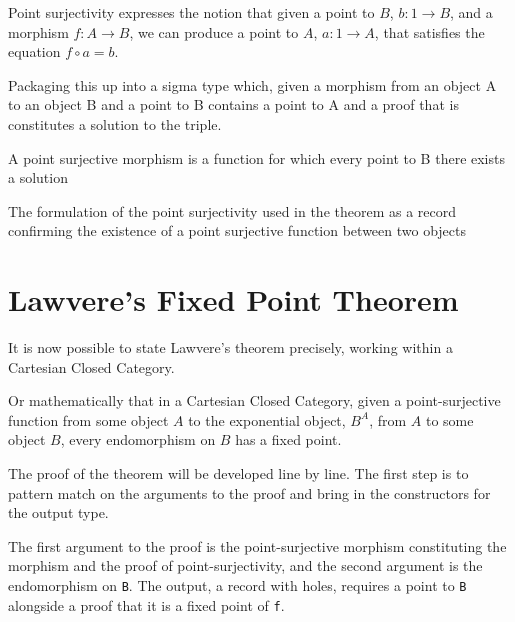 
Point surjectivity expresses the notion that given a point to $B$, $b : 1
\rightarrow B$, and a morphism $f : A \rightarrow B$, we can produce a point to
$A$, $a : 1 \rightarrow A$, that satisfies the equation $f \circ a = b$.

Packaging this up into a sigma type which, given a morphism from an object A to
an object B and a point to B contains a point to A and a proof that is
constitutes a solution to the triple.


A point surjective morphism is a function for which every point to B there
exists a solution


The formulation of the point surjectivity used in the theorem as a record
confirming the existence of a point surjective function between two objects


\section{Lawvere's Fixed Point Theorem}

It is now possible to state Lawvere's theorem precisely, working within a
Cartesian Closed Category.


Or mathematically that in a Cartesian Closed Category, given a point-surjective
function from some object $A$ to the exponential object, $B^A$, from $A$ to some object
$B$, every endomorphism on $B$ has a fixed point.

The proof of the theorem will be developed line by line. The first step is to
pattern match on the arguments to the proof and bring in the constructors for
the output type.

\begin{AgdaMultiCode}
\end{AgdaMultiCode}

The first argument to the proof is the point-surjective morphism constituting
the morphism and the proof of point-surjectivity, and the second argument is the
endomorphism on \verb|B|. The output, a record with holes, requires a point to
\verb|B| alongside a proof that it is a fixed point of \verb|f|.

